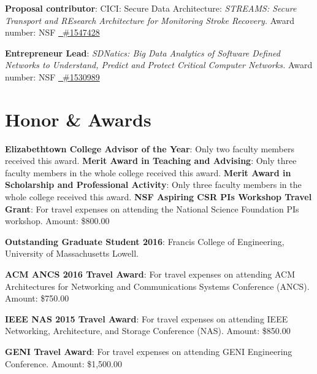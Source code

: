 \documentclass[11pt]{moderncv}
\begin{document}
%
{\textbf{Proposal contributor}: CICI: Secure Data Architecture: \textit{STREAMS: Secure Transport and REsearch Architecture for Monitoring Stroke Recovery.} \newline
Award number: NSF \href{https://www.nsf.gov/awardsearch/showAward?AWD_ID=1547428}
  {\color{color2}\homepagesymbol~\#1547428} 
}

%
{\textbf{Entrepreneur Lead}: \textit{SDNatics: Big Data Analytics of Software Defined Networks to Understand, Predict and Protect Critical Computer Networks.} \newline
Award number: NSF \href{https://www.nsf.gov/awardsearch/showAward?AWD_ID=1530989}
    {\color{color2}\homepagesymbol~\#1530989} \newline
}

\section{Honor \& Awards}
%
{\textbf{Elizabethtown College Advisor of the Year}: Only two faculty members received this award. \newline
}
%
{\textbf{Merit Award in Teaching and Advising}: Only three faculty members in the whole college received this award. \newline
}
%
{\textbf{Merit Award in Scholarship and Professional Activity}: Only three faculty members in the whole college received this award. \newline
}
%
{\textbf{NSF Aspiring CSR PIs Workshop Travel Grant}: For travel expenses on attending the National Science Foundation PIs workshop. \newline
Amount: \$800.00
}

%
{\textbf{Outstanding Graduate Student 2016}: Francis College of Engineering, University of Massachusetts Lowell.
}

%
{\textbf{ACM ANCS 2016 Travel Award}: For travel expenses on attending ACM Architectures for Networking and Communications Systems Conference (ANCS). \newline
Amount: \$750.00
}

%
{\textbf{IEEE NAS 2015 Travel Award}: For travel expenses on attending IEEE Networking, Architecture, and Storage Conference (NAS). \newline
Amount: \$850.00
}

%
{\textbf{GENI Travel Award}: For travel expenses on attending GENI Engineering Conference. \newline
Amount: \$1,500.00
}
\end{document}

